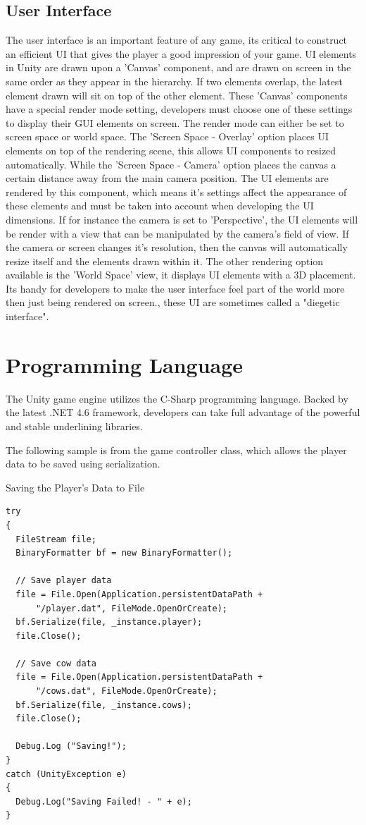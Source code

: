 \subsection{User Interface}
The user interface is an important feature of any game, its critical to construct an efficient UI that gives the player a good impression of your game. UI elements in Unity are drawn upon a 'Canvas' component, and are drawn on screen in the same order as they appear in the hierarchy. If two elements overlap, the latest element drawn will sit on top of the other element. These 'Canvas' components have a special render mode setting, developers must choose one of these settings to display their GUI elements on screen. The render mode can either be set to screen space or world space. The 'Screen Space - Overlay' option places UI elements on top of the rendering scene, this allows UI components to resized automatically. While the 'Screen Space - Camera' option places the canvas a certain distance away from the main camera position. The UI elements are rendered by this component, which means it's settings affect the appearance of these elements and must be taken into account when developing the UI dimensions. If for instance the camera is set to 'Perspective', the UI elements will be render with a view that can be manipulated by the camera's field of view. If the camera or screen changes it's resolution, then the canvas will automatically resize itself and the elements drawn within it. The other rendering option available is the 'World Space' view, it displays UI elements with a 3D placement. Its handy for developers to make the user interface feel part of the world more then just being rendered on screen., these UI are sometimes called a "diegetic interface". 

\section{Programming Language}
The Unity game engine utilizes the C-Sharp programming language. Backed by the latest .NET 4.6 framework, developers can take full advantage of the powerful and stable underlining libraries. 

The following sample is from the game controller class, which allows the player data to be saved using serialization.

Saving the Player's Data to File
\begin{verbatim}
try
{
  FileStream file;
  BinaryFormatter bf = new BinaryFormatter();

  // Save player data
  file = File.Open(Application.persistentDataPath + 
	  "/player.dat", FileMode.OpenOrCreate);
  bf.Serialize(file, _instance.player);
  file.Close();

  // Save cow data
  file = File.Open(Application.persistentDataPath + 
	  "/cows.dat", FileMode.OpenOrCreate);
  bf.Serialize(file, _instance.cows);
  file.Close();

  Debug.Log ("Saving!");
}
catch (UnityException e)
{
  Debug.Log("Saving Failed! - " + e);
}
\end{verbatim}

